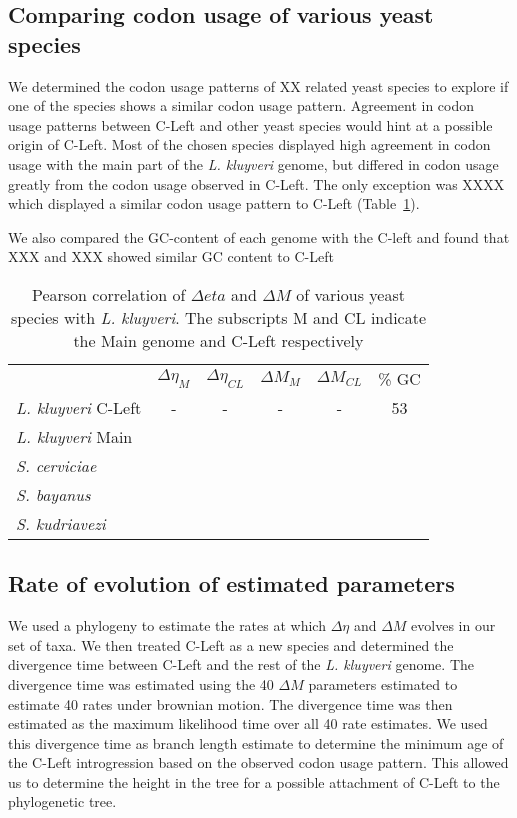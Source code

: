 \documentclass[12pt,draft]{article}
\begin{document}
\subsection*{Comparing codon usage of various yeast species}
We determined the codon usage patterns of XX related yeast species to explore if one of the species shows a similar codon usage pattern.
Agreement in codon usage patterns between C-Left and other yeast species would hint at a possible origin of C-Left.
Most of the chosen species displayed high agreement in codon usage with the main part of the \textit{L. kluyveri} genome, but differed in codon usage greatly from the codon usage observed in C-Left.
The only exception was XXXX which displayed a similar codon usage pattern to C-Left (Table~\ref{corr_table}).

We also compared the GC-content of each genome with the C-left and found that XXX and XXX showed similar GC content to C-Left


\begin{table}[]
\centering
\label{corr_table}
\begin{tabular}{lccccc}
 & $\Delta \eta_M$ & $\Delta \eta_{CL}$ & $\Delta M_M$ & $\Delta M_{CL}$ & \% GC \\
\textit{L. kluyveri} C-Left & - & - & - & - & 53 \\
\textit{L. kluyveri} Main	&  &  &  & & \\
\textit{S. cerviciae} 		&  &  &  & & \\
\textit{S. bayanus} 		&  &  &  & & \\
\textit{S. kudriavezi} 		&  &  &  & &
\end{tabular}
\caption{Pearson correlation of $\Delta eta$ and $\Delta M$ of various yeast species with \textit{L. kluyveri}. The subscripts M and CL indicate the Main genome and C-Left respectively}
\end{table}

\subsection*{Rate of evolution of estimated parameters}
We used a phylogeny to estimate the rates at which $\Delta \eta$ and $\Delta M$ evolves in our set of taxa. 
We then treated C-Left as a new species and determined the divergence time between C-Left and the rest of the \textit{L. kluyveri} genome.
The divergence time was estimated using the 40 $\Delta M$ parameters estimated to estimate 40 rates under brownian motion. 
The divergence time was then estimated as the maximum likelihood time over all 40 rate estimates.
We used this divergence time as branch length estimate to determine the minimum age of the C-Left introgression based on the observed codon usage pattern.
This allowed us to determine the height in the tree for a possible attachment of C-Left to the phylogenetic tree.
\end{document}
